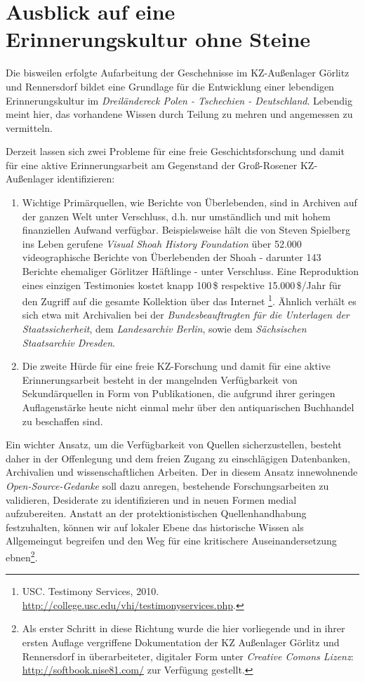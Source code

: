 

\section{Ausblick auf eine Erinnerungskultur ohne Steine}
Die bisweilen erfolgte Aufarbeitung der Geschehnisse im KZ-Außenlager
Görlitz und Rennersdorf bildet eine Grundlage für die\emph{ }Entwicklung
einer lebendigen Erinnerungskultur im \emph{Dreiländereck Polen -
Tschechien - Deutschland}. Lebendig meint hier, das vorhandene Wissen
durch Teilung zu mehren und angemessen zu vermitteln. 

Derzeit lassen sich zwei Probleme für eine freie Geschichtsforschung
und damit für eine aktive Erinnerungsarbeit am Gegenstand der Groß-Rosener
KZ-Außenlager identifizieren: 
\begin{enumerate}
\item Wichtige Primärquellen, wie Berichte von Überlebenden, sind in Archiven
auf der ganzen Welt unter Verschluss, d.h. nur umständlich und mit
hohem finanziellen Aufwand verfügbar. Beispielsweise hält die von
Steven Spielberg ins Leben gerufene \emph{Visual Shoah History Foundation}
über 52.000 videographische Berichte von Überlebenden der Shoah -
da\-runter 143 Berichte ehemaliger Görlitzer Häftlinge - unter Verschluss.
Eine Reproduktion eines einzigen Testimonies kostet knapp 100\,\$ respektive
15.000\,\$/Jahr für den Zugriff auf die gesamte Kollektion über das
Internet \footnote{USC. Testimony Services, 2010. \url{http://college.usc.edu/vhi/testimonyservices.php}.}. Ähnlich verhält es sich etwa mit Archivalien
bei der \emph{Bundesbeauftragten für die Unterlagen der Staatssicherheit},
dem \emph{Landesarchiv Berlin}, sowie dem \emph{Sächsischen Staatsarchiv
Dresden}.
\item Die zweite Hürde für eine freie KZ-Forschung und damit für eine aktive
Erinnerungsarbeit besteht in der mangelnden Verfügbarkeit von Sekundärquellen
in Form von Publikationen, die aufgrund ihrer geringen Auflagenstärke
heute nicht einmal mehr über den antiquarischen Buchhandel zu beschaffen
sind. 
\end{enumerate}
Ein wichter Ansatz, um die Verfügbarkeit von Quellen sicherzustellen,
besteht daher in der Offenlegung und dem freien Zugang zu einschlägigen
Datenbanken, Archivalien und wissenschaftlichen Arbeiten. Der in diesem
Ansatz innewohnende \emph{Open-Source-Gedanke} soll dazu anregen,
bestehende Forschungsarbeiten zu validieren, Desiderate zu identifizieren
und in neuen Formen medial aufzubereiten. Anstatt an der protektionistischen
Quellenhandhabung festzuhalten, können wir auf lokaler Ebene das historische
Wissen als Allgemeingut begreifen und den Weg für eine kritischere
Auseinandersetzung ebnen\footnote{Als erster Schritt in diese Richtung wurde die hier vorliegende und in ihrer ersten Auflage vergriffene Dokumentation der KZ Außenlager Görlitz und Rennersdorf in überarbeiteter, digitaler Form unter \emph{Creative Comons Lizenz}: \url{http://softbook.nise81.com/} zur Verfügung gestellt.}. 

